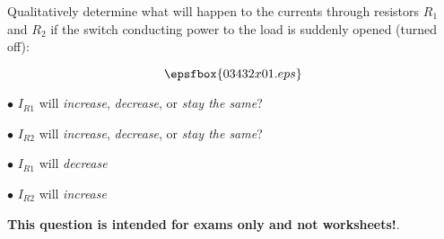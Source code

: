 

Qualitatively determine what will happen to the currents through resistors $R_1$ and $R_2$ if the switch conducting power to the load is suddenly opened (turned off):

$$\epsfbox{03432x01.eps}$$

\medskip
\item{$\bullet$} $I_{R1}$ will {\it increase}, {\it decrease}, or {\it stay the same}?
\item{$\bullet$} $I_{R2}$ will {\it increase}, {\it decrease}, or {\it stay the same}?
\medskip







\medskip
\item{$\bullet$} $I_{R1}$ will {\it decrease}
\item{$\bullet$} $I_{R2}$ will {\it increase}
\medskip







{\bf This question is intended for exams only and not worksheets!}.



